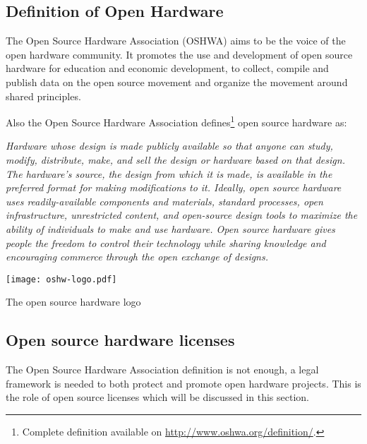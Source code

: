 \subsection{Definition of Open Hardware } %

The Open Source Hardware Association (OSHWA) aims to be the voice of the open hardware community. It promotes the use and development of open source hardware for education and economic development, to collect, compile and publish data on the open source movement and organize the movement around shared principles.

Also the Open Source Hardware Association defines\footnote{Complete definition available on \url{http://www.oshwa.org/definition/}.} open source hardware as:

\begin{row}{4}{2}
    \begin{cell}{3}
        \emph{Hardware whose design is made publicly available so that anyone can study, modify, distribute, make, and sell the design or hardware based on that design. The hardware’s source, the design from which it is made, is available in the preferred format for making modifications to it. Ideally, open source hardware uses readily-available components and materials, standard processes, open infrastructure, unrestricted content, and open-source design tools to maximize the ability of individuals to make and use hardware. Open source hardware gives people the freedom to control their technology while sharing knowledge and encouraging commerce through the open exchange of designs.}
    \end{cell}
    \begin{cell}{1}
        \begin{NFfigure}
            \centering
                \texttt{[image: oshw-logo.pdf]}
            \caption{The open source hardware logo}
            \label{fig:ohw-logo}
        \end{NFfigure}
    \end{cell}
\end{row}


\subsection{Open source hardware licenses} %

The Open Source Hardware Association definition is not enough, a legal framework is needed to both protect and promote open hardware projects. This is the role of open source licenses which will be discussed in this section.

